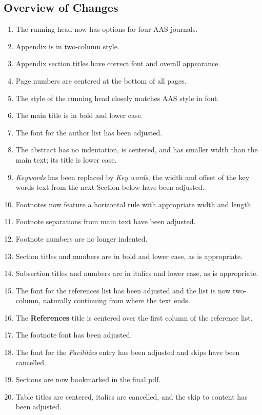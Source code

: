 \documentclass[tighten,twocolumn,useAMS,appendixfloats,apj]{likeapj}
\begin{document}
{{    

    \subsection{Overview of Changes}
\begin{enumerate}
\itemsep-3pt 
\item The running head now has options for four AAS journals.
\item Appendix is in two-column style.
\item Appendix section titles have correct font and overall appearance.
\item Page numbers are centered at the bottom of all pages.
\item The style of the running head closely matches AAS style in font.
\item The main title is in bold and lower case.
\item The font for the author list has been adjusted.
\item The abstract has no indentation, is centered, and has smaller width
  than the main text; its title is lower case.
\item {\it Keywords} has been replaced by {\it Key words}; the width and offset of the key words text from the next Section below have been adjusted.
\item Footnotes now feature a horizontal rule with appropriate width and length.
\item Footnote separations from main text have been adjusted.
\item Footnote numbers are no longer indented.
\item Section titles and numbers are in bold and lower case, as is appropriate.
\item Subsection titles and numbers are in italics and lower case, as is appropriate.
\item The font for the references list has been adjusted and the list is now two-column, naturally continuing from where the text ends.
\item The {\bf References} title is centered over the first column of the reference list.
\item The footnote font has been adjusted.
\item The font for the {\it Facilities} entry has been adjusted and skips have been cancelled.
\item Sections are now bookmarked in the final pdf.
\item Table titles are centered, italics are cancelled, and the skip to content has been adjusted.

\end{enumerate}}}
\end{document}
